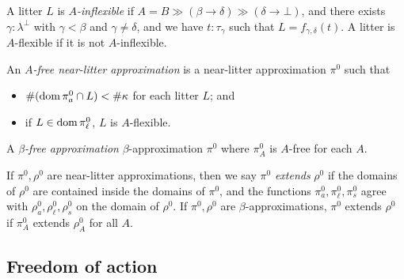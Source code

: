 \documentclass{article}
\begin{document}
\begin{definition}
    A litter \( L \) is \emph{\( A \)-inflexible} if \( A = B \gg (\beta \longrightarrow \delta) \gg (\delta \longrightarrow \bot) \), and there exists \( \gamma : \lambda^\bot \) with \( \gamma < \beta \) and \( \gamma \neq \delta \), and we have \( t : \tau_\gamma \) such that \( L = f_{\gamma,\delta}(t) \).
    A litter is \( A \)-flexible if it is not \( A \)-inflexible.
\end{definition}
\begin{definition}
    An \emph{\( A \)-free near-litter approximation} is a near-litter approximation \( \pi^0 \) such that
    \begin{itemize}
        \item \( \#(\operatorname{dom} \pi^0_a \cap L) < \#\kappa \) for each litter \( L \); and
        \item if \( L \in \operatorname{dom} \pi^0_\ell \), \( L \) is \( A \)-flexible.
    \end{itemize}
    A \emph{\( \beta \)-free approximation} \( \beta \)-approximation \( \pi^0 \) where \( \pi^0_A \) is \( A \)-free for each \( A \).
\end{definition}
\begin{definition}
    If \( \pi^0, \rho^0 \) are near-litter approximations, then we say \( \pi^0 \) \emph{extends} \( \rho^0 \) if the domains of \( \rho^0 \) are contained inside the domains of \( \pi^0 \), and the functions \( \pi^0_a, \pi^0_\ell, \pi^0_s \) agree with \( \rho^0_a, \rho^0_\ell, \rho^0_s \) on the domain of \( \rho^0 \).
    If \( \pi^0, \rho^0 \) are \( \beta \)-approximations, \( \pi^0 \) extends \( \rho^0 \) if \( \pi^0_A \) extends \( \rho^0_A \) for all \( A \).
\end{definition}

\subsection{Freedom of action}
\end{document}
